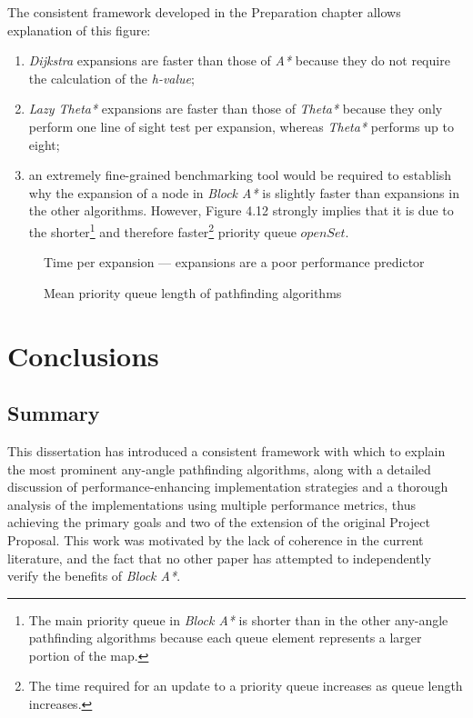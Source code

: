 \documentclass[12pt,notitlepage]{report}
\begin{document}
\noindent
The consistent framework developed in the Preparation chapter allows explanation of this figure:
\begin{enumerate}
\item {\em Dijkstra} expansions are faster than those of {\em A*} because they do not require the calculation of the {\em h-value};
\item {\em Lazy Theta*} expansions are faster than those of {\em Theta*} because they only perform one line of sight test per expansion, whereas {\em Theta*} performs up to eight;
\item an extremely fine-grained benchmarking tool would be required to establish why the expansion of a node in {\em Block A*} is slightly faster than expansions in the other algorithms. However, Figure 4.12 strongly implies that it is due to the shorter\footnote{The main priority queue in {\em Block A*} is shorter than in the other any-angle pathfinding algorithms because each queue element represents a larger portion of the map.} and therefore faster\footnote{The time required for an update to a priority queue increases as queue length increases\cite{CormenDijkstra}.} priority queue $openSet$.
\end{enumerate}

\begin{figure}
\centering

\caption[Time per expansion of pathfinding algorithms]{Time per expansion --- expansions are a poor performance predictor}

\caption[Mean priority queue length of pathfinding algorithms]{Mean priority queue length of pathfinding algorithms}
\end{figure}

\chapter{Conclusions}

\section{Summary}
This dissertation has introduced a consistent framework with which to explain the most prominent any-angle pathfinding algorithms, along with a detailed discussion of performance-enhancing implementation strategies and a thorough analysis of the implementations using multiple performance metrics, thus achieving the primary goals and two of the extension of the original Project Proposal. This work was motivated by the lack of coherence in the current literature, and the fact that no other paper has attempted to independently verify the benefits of {\em Block A*}.\\
\end{document}
